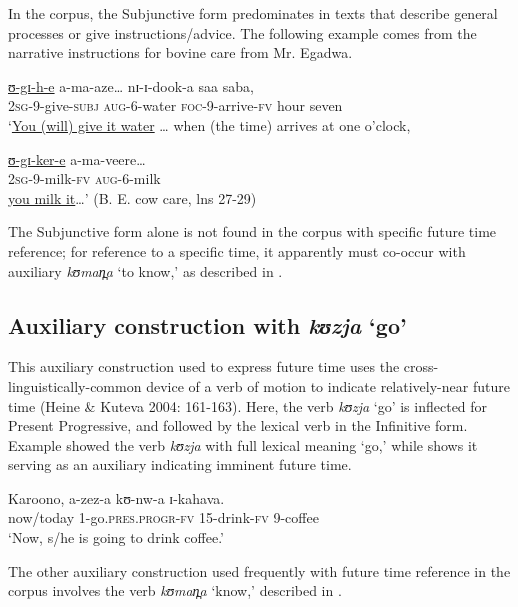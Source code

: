\documentclass[output=paper]{langsci/langscibook}
\begin{document}
In the corpus, the Subjunctive form predominates in texts that describe general processes or give instructions/advice. The following example comes from the narrative instructions for bovine care from Mr. Egadwa. 

\ea\label{ex:sarvasy:18}
\gll \underline{ʊ{}-gɪ-h-e}     a-ma-aze…   nɪ-ɪ{}-dook-a   saa   saba, \\  
\textsc{\textup{2sg}}\textsc{{}-}9-give-\textsc{subj}  \textsc{aug}{}-6-water  \textsc{foc}{}-9-arrive-\textsc{fv}  hour  seven \\
\glt ‘\underline{You (will) give it water} … when (the time) arrives at one o’clock,

\gll \underline{ʊ{}-gɪ-ker-e}   a-ma-veere\ldots \\
\textsc{2sg}{}-9-milk-\textsc{fv}  \textsc{aug}{}-6-milk \\
\glt \underline{you milk it}…’ (B. E. cow care, lns 27-29)
\z

The Subjunctive form alone is not found in the corpus with specific future time reference; for reference to a specific time, it apparently must co-occur with auxiliary \textit{kʊman̪a }‘to know,’ as described in . 

\subsection{Auxiliary construction with \textit{kʊzja }‘go’} \label{sec:sarvasy:7.2}

This auxiliary construction used to express future time uses the cross-linguistically-common device of a verb of motion to indicate relatively-near future time (Heine \& Kuteva 2004: 161-163). Here, the verb \textit{kʊzja }‘go’ is inflected for Present Progressive, and followed by the lexical verb in the Infinitive form. Example  showed the verb \textit{kʊzja }with full lexical meaning ‘go,’ while  shows it serving as an auxiliary indicating imminent future time. 

\ea\label{ex:sarvasy:19}
\gll Karoono,   a-zez-a      kʊ-nw-a  ɪ{}-kahava. \\
now/today  1-go.\textsc{pres.progr-fv}  15-drink-\textsc{fv}  9-coffee \\
\glt ‘Now, s/he is going to drink coffee.’
\z

The other auxiliary construction used frequently with future time reference in the corpus involves the verb \textit{kʊman̪a }‘know,’ described in .
\end{document}
